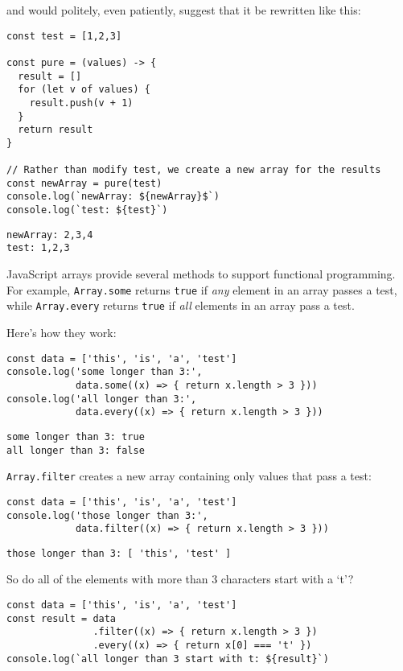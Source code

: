 \noindent
and would politely, even patiently, suggest that it be rewritten like this:

\begin{verbatim}
const test = [1,2,3]

const pure = (values) -> {
  result = []
  for (let v of values) {
    result.push(v + 1)
  }
  return result
}

// Rather than modify test, we create a new array for the results
const newArray = pure(test)
console.log(`newArray: ${newArray}$`)
console.log(`test: ${test}`)
\end{verbatim}

\begin{verbatim}
newArray: 2,3,4
test: 1,2,3
\end{verbatim}

JavaScript arrays provide several methods to support functional programming.
For example,
\texttt{Array.some} returns \texttt{true} if \emph{any} element in an array passes a test,
while \texttt{Array.every} returns \texttt{true} if \emph{all} elements in an array pass a test.

Here's how they work:

\begin{verbatim}
const data = ['this', 'is', 'a', 'test']
console.log('some longer than 3:',
            data.some((x) => { return x.length > 3 }))
console.log('all longer than 3:',
            data.every((x) => { return x.length > 3 }))
\end{verbatim}

\begin{verbatim}
some longer than 3: true
all longer than 3: false
\end{verbatim}

\texttt{Array.filter} creates a new array containing only values that pass a test:

\begin{verbatim}
const data = ['this', 'is', 'a', 'test']
console.log('those longer than 3:',
            data.filter((x) => { return x.length > 3 }))
\end{verbatim}

\begin{verbatim}
those longer than 3: [ 'this', 'test' ]
\end{verbatim}

So do all of the elements with more than 3 characters start with a `t'?

\begin{verbatim}
const data = ['this', 'is', 'a', 'test']
const result = data
               .filter((x) => { return x.length > 3 })
               .every((x) => { return x[0] === 't' })
console.log(`all longer than 3 start with t: ${result}`)
\end{verbatim}

